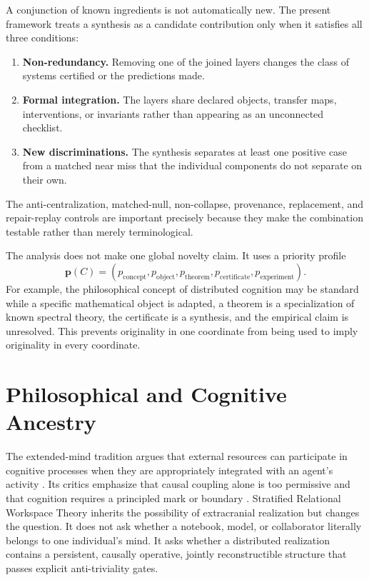 A conjunction of known ingredients is not automatically new. The present
framework treats a synthesis as a candidate contribution only when it satisfies
all three conditions:
\begin{enumerate}
\item \textbf{Non-redundancy.} Removing one of the joined layers changes the
 class of systems certified or the predictions made.
\item \textbf{Formal integration.} The layers share declared objects,
 transfer maps, interventions, or invariants rather than appearing as an
 unconnected checklist.
\item \textbf{New discriminations.} The synthesis separates at least one
 positive case from a matched near miss that the individual components do
 not separate on their own.
\end{enumerate}
The anti-centralization, matched-null, non-collapse, provenance, replacement,
and repair-replay controls are important precisely because they make the
combination testable rather than merely terminological.


The analysis does not make one global novelty claim. It uses a priority
profile
\[
\boxed{
\mathbf p(C)
=
\left(
 p_{\mathrm{concept}},
 p_{\mathrm{object}},
 p_{\mathrm{theorem}},
 p_{\mathrm{certificate}},
 p_{\mathrm{experiment}}
\right).
}
\]
For example, the philosophical concept of distributed cognition may be
standard while a specific mathematical object is adapted, a theorem is a
specialization of known spectral theory, the certificate is a synthesis, and
the empirical claim is unresolved. This prevents originality in one
coordinate from being used to imply originality in every coordinate.

\section{Philosophical and Cognitive Ancestry}


The extended-mind tradition argues that external resources can participate in
cognitive processes when they are appropriately integrated with an agent's
activity \cite{SRWT:ClarkChalmers1998}. Its critics emphasize that causal coupling
alone is too permissive and that cognition requires a principled mark or
boundary \cite{SRWT:AdamsAizawa2001,SRWT:Rupert2004}. Stratified Relational Workspace
Theory inherits the possibility of extracranial realization but changes the
question. It does not ask whether a notebook, model, or collaborator literally
belongs to one individual's mind. It asks whether a distributed realization
contains a persistent, causally operative, jointly reconstructible structure
that passes explicit anti-triviality gates.

